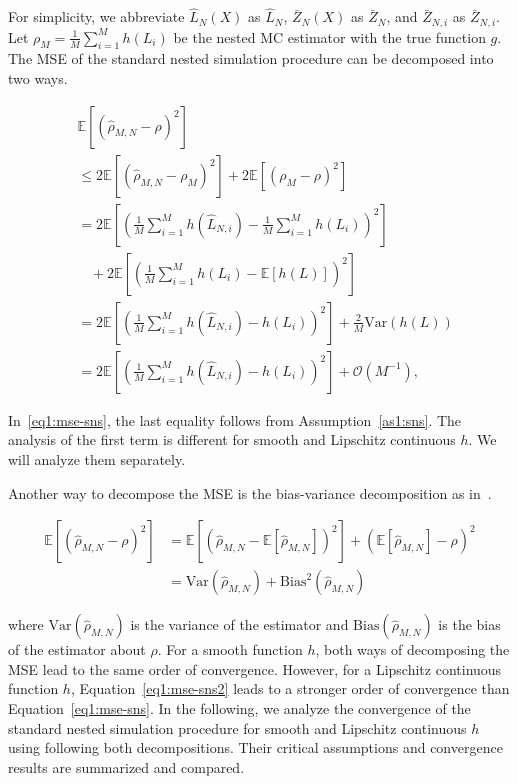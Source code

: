 For simplicity, we abbreviate $\hat{L}_N(X)$ as $\hat{L}_N$, $\bar{Z}_N(X)$ as $\bar{Z}_N$, and $\bar{Z}_{N, i}$ as $\bar{Z}_{N, i}$.
Let $\rho_M = \frac{1}{M} \sum_{i=1}^M h(L_i)$ be the nested MC estimator with the true function $g$.
The MSE of the standard nested simulation procedure can be decomposed into two ways.

\begin{align} \label{eq1:mse-sns}
    & \mathbb{E} \left[ \left( \hat{\rho}_{M, N} - \rho \right)^2 \right] \nonumber \\
    & \leq 2 \mathbb{E} \left[ \left( \hat{\rho}_{M, N} - \rho_M \right)^2 \right] 
            + 2  \mathbb{E} \left[ \left(\rho_M - \rho \right)^2 \right]  \nonumber \\
    & = 2 \mathbb{E} \left[  \left( \frac{1}{M} \sum_{i=1}^M h\left( \hat{L}_{N, i} \right) -  \frac{1}{M} \sum_{i=1}^M h\left(L_i \right)  \right)^2\right] \nonumber \\
    & ~~~~ + 2  \mathbb{E} \left[ \left(\frac{1}{M} \sum_{i=1}^M h\left(L_i \right) - \mathbb{E}\left[ h(L)\right] \right)^2 \right]  \nonumber \\
    & = 2 \mathbb{E} \left[  \left( \frac{1}{M} \sum_{i=1}^M h\left( \hat{L}_{N, i} \right) -  h\left(L_i \right)  \right)^2\right] + \frac{2}{M} \text{Var}(h(L)) \nonumber \\
    & = 2 \mathbb{E} \left[  \left( \frac{1}{M} \sum_{i=1}^M h\left( \hat{L}_{N, i} \right) -  h\left(L_i \right)  \right)^2\right] + \mathcal{O}(M^{-1}),
\end{align}

In~\ref{eq1:mse-sns}, the last equality follows from Assumption~\ref{as1:sns}.
The analysis of the first term is different for smooth and Lipschitz continuous $h$. 
We will analyze them separately.

Another way to decompose the MSE is the bias-variance decomposition as in~\cite{gordy2010nested}.

\begin{align} \label{eq1:mse-sns2}
    \mathbb{E} \left[ \left( \hat{\rho}_{M, N} - \rho \right)^2 \right] 
    & = \mathbb{E} \left[ \left( \hat{\rho}_{M, N} - \mathbb{E} \left[ \hat{\rho}_{M, N} \right] \right)^2 \right] + \left( \mathbb{E} \left[ \hat{\rho}_{M, N} \right] - \rho \right)^2 \nonumber \\
    & = \text{Var}(\hat{\rho}_{M, N}) + \text{Bias}^2(\hat{\rho}_{M, N})
\end{align}
    
where $\text{Var}(\hat{\rho}_{M, N})$ is the variance of the estimator and $\text{Bias}(\hat{\rho}_{M, N})$ is the bias of the estimator about $\rho$.
For a smooth function $h$, both ways of decomposing the MSE lead to the same order of convergence.
However, for a Lipschitz continuous function $h$, Equation~\ref{eq1:mse-sns2} leads to a stronger order of convergence than Equation~\ref{eq1:mse-sns}.
In the following, we analyze the convergence of the standard nested simulation procedure for smooth and Lipschitz continuous $h$ using following both decompositions.
Their critical assumptions and convergence results are summarized and compared.

